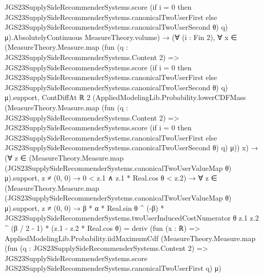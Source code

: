 \documentclass[10pt]{article}
\begin{document}
\begin{ReviewVerbatim}
                      JGS23SupplySideRecommenderSystems.score
                        (if i = 0 then JGS23SupplySideRecommenderSystems.canonicalTwoUserFirst
                        else JGS23SupplySideRecommenderSystems.canonicalTwoUserSecond θ)
                        q)
                    μ).AbsolutelyContinuous
                MeasureTheory.volume) →
            (∀ (i : Fin 2),
                ∀
                  x ∈
                    (MeasureTheory.Measure.map
                        (fun (q : JGS23SupplySideRecommenderSystems.Content 2) =>
                          JGS23SupplySideRecommenderSystems.score
                            (if i = 0 then JGS23SupplySideRecommenderSystems.canonicalTwoUserFirst
                            else JGS23SupplySideRecommenderSystems.canonicalTwoUserSecond θ)
                            q)
                        μ).support,
                  ContDiffAt ℝ 2
                    (AppliedModelingLib.Probability.lowerCDFMass
                      (MeasureTheory.Measure.map
                        (fun (q : JGS23SupplySideRecommenderSystems.Content 2) =>
                          JGS23SupplySideRecommenderSystems.score
                            (if i = 0 then JGS23SupplySideRecommenderSystems.canonicalTwoUserFirst
                            else JGS23SupplySideRecommenderSystems.canonicalTwoUserSecond θ)
                            q)
                        μ))
                    x) →
              (∀
                  z ∈
                    (MeasureTheory.Measure.map (JGS23SupplySideRecommenderSystems.canonicalTwoUserValueMap θ)
                        μ).support,
                  z ≠ (0, 0) → 0 < z.1 ∧ z.1 * Real.cos θ < z.2) →
                ∀
                  z ∈
                    (MeasureTheory.Measure.map (JGS23SupplySideRecommenderSystems.canonicalTwoUserValueMap θ)
                        μ).support,
                  z ≠ (0, 0) →
                    β * α * Real.sin θ ^ (-β) *
                            JGS23SupplySideRecommenderSystems.twoUserInducedCostNumerator θ z.1 z.2 ^ (β / 2 - 1) *
                          (z.1 - z.2 * Real.cos θ) =
                        deriv
                          (fun (x : ℝ) =>
                            AppliedModelingLib.Probability.iidMaximumCdf
                              (MeasureTheory.Measure.map
                                (fun (q : JGS23SupplySideRecommenderSystems.Content 2) =>
                                  JGS23SupplySideRecommenderSystems.score
                                    JGS23SupplySideRecommenderSystems.canonicalTwoUserFirst q)
                                μ)

\end{ReviewVerbatim}
\end{document}
